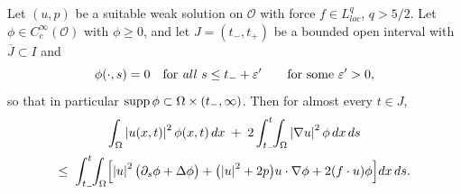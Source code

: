 \documentclass[11pt,reqno]{amsart}
\begin{document}
\begin{lemma}\label{lem:lei-pointwise}
Let $(u,p)$ be a suitable weak solution on $\mathcal{O}$ with force
$f\in L^{q}_{loc}$, $q>5/2$. Let $\phi\in C_{c}^{\infty}(\mathcal{O})$
with $\phi\ge0$, and let $J=(t_{-},t_{+})$ be a bounded open interval with
$\overline{J}\subset I$ and
\begin{equation}\label{eq:phi-vanishes}
  \phi(\cdot,s)=0\quad\text{for \emph{all} }s\le t_{-}+\varepsilon'
  \qquad\text{for some }\varepsilon'>0 ,
\end{equation}
so that in particular $\operatorname{supp}\phi\subset\Omega\times(t_{-},\infty)$. Then for
almost every $t\in J$,
\begin{multline}\label{eq:lei-pointwise}
  \int_{\Omega}\left\lvert u(x,t) \right\rvert^{2}\phi(x,t)\,dx
  \;+\;2\int_{t_{-}}^{t}\!\!\int_{\Omega}\left\lvert \nabla u \right\rvert^{2}\phi\,dx\,ds\\
  \le\;\int_{t_{-}}^{t}\!\!\int_{\Omega}
    \Bigl[\left\lvert u \right\rvert^{2}\bigl(\partial_{s}\phi+\Delta\phi\bigr)
      +\bigl(\left\lvert u \right\rvert^{2}+2p\bigr)u\cdot\nabla\phi
      +2(f\cdot u)\phi\Bigr]dx\,ds .
\end{multline}
\end{lemma}
\end{document}
